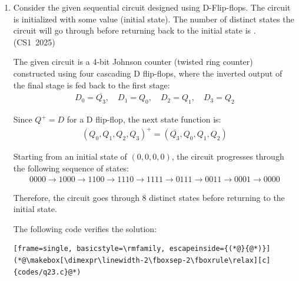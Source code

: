 \begin{enumerate}[label=\thesubsection.\arabic*, ref=\thesubsection.\theenumi]
\begin{figure}[H]
    \centering
    
    \caption{FSM Sequential Circuit Implementation using D Flip-Flops}
    \label{fig:q22_circuit}
\end{figure}

The following code verifies the solution:
\begin{lstlisting}[frame=single, basicstyle=\rmfamily, escapeinside={(*@}{@*)}]
(*@\makebox[\dimexpr\linewidth-2\fboxsep-2\fboxrule\relax][c]{codes/q22.c}@*)
\end{lstlisting}

\vspace{0.5cm}
\item Consider the given sequential circuit designed using D-Flip-flops. The circuit is initialized with some value (initial state). The number of distinct states the circuit will go through before returning back to the initial state is \underline{\hspace{1cm}}.
\hfill (CS1~2025)

\begin{figure}[H]
    \centering
    
\end{figure}

\vspace{0.2cm}
\solution
The given circuit is a 4-bit Johnson counter (twisted ring counter) constructed using four cascading D flip-flops, where the inverted output of the final stage is fed back to the first stage:
\begin{align}
D_0 = \overline{Q_3}, \quad D_1 = Q_0, \quad D_2 = Q_1, \quad D_3 = Q_2
\end{align}

Since $Q^+ = D$ for a D flip-flop, the next state function is:
\begin{align}
(Q_0, Q_1, Q_2, Q_3)^+ = (\overline{Q_3}, Q_0, Q_1, Q_2)
\end{align}

Starting from an initial state of $(0, 0, 0, 0)$, the circuit progresses through the following sequence of states:
\begin{align}
0000 \to 1000 \to 1100 \to 1110 \to 1111 \to 0111 \to 0011 \to 0001 \to 0000
\end{align}

Therefore, the circuit goes through 8 distinct states before returning to the initial state.

The following code verifies the solution:
\begin{lstlisting}[frame=single, basicstyle=\rmfamily, escapeinside={(*@}{@*)}]
(*@\makebox[\dimexpr\linewidth-2\fboxsep-2\fboxrule\relax][c]{codes/q23.c}@*)
\end{lstlisting}


\end{enumerate}
